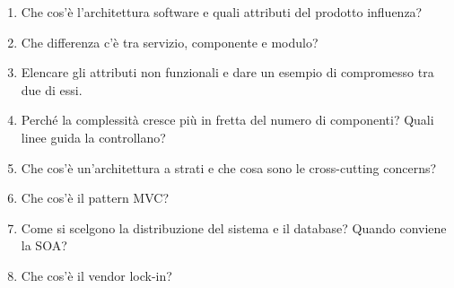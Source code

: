 \begin{domande}
\begin{enumerate}
  \item Che cos'è l'architettura software e quali attributi del prodotto influenza?
  \item Che differenza c'è tra servizio, componente e modulo?
  \item Elencare gli attributi non funzionali e dare un esempio di compromesso tra due di essi.
  \item Perché la complessità cresce più in fretta del numero di componenti? Quali linee guida la controllano?
  \item Che cos'è un'architettura a strati e che cosa sono le cross-cutting concerns?
  \item Che cos'è il pattern MVC?
  \item Come si scelgono la distribuzione del sistema e il database? Quando conviene la SOA?
  \item Che cos'è il vendor lock-in?
\end{enumerate}
\end{domande}
